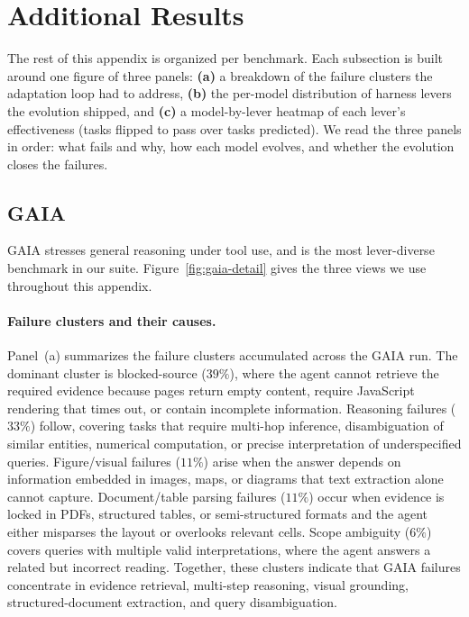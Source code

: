 \section{Additional Results}
\label{app:additional}

The rest of this appendix is organized per benchmark. Each subsection is built
around one figure of three panels: \textbf{(a)} a breakdown of the failure
clusters the adaptation loop had to address, \textbf{(b)} the per-model
distribution of harness levers the evolution shipped, and \textbf{(c)} a
model-by-lever heatmap of each lever's effectiveness (tasks flipped to pass over
tasks predicted). We read the three panels in order: what fails and why, how
each model evolves, and whether the evolution closes the failures. 

\subsection{GAIA}
\label{app:gaia-detail}

GAIA stresses general reasoning under tool use, and is the most lever-diverse
benchmark in our suite. Figure~\ref{fig:gaia-detail} gives the three views we
use throughout this appendix.

\paragraph{Failure clusters and their causes.} Panel~(a) summarizes the failure clusters accumulated across the GAIA run. The dominant cluster is blocked-source ($39\%$), where the agent cannot retrieve the required evidence because pages return empty content, require JavaScript rendering that times out, or contain incomplete information. Reasoning failures ($33\%$) follow, covering tasks that require multi-hop inference, disambiguation of similar entities, numerical computation, or precise interpretation of underspecified queries. Figure/visual failures ($11\%$) arise when the answer depends on information embedded in images, maps, or diagrams that text extraction alone cannot capture. Document/table parsing failures ($11\%$) occur when evidence is locked in PDFs, structured tables, or semi-structured formats and the agent either misparses the layout or overlooks relevant cells. Scope ambiguity ($6\%$) covers queries with multiple valid interpretations, where the agent answers a related but incorrect reading. Together, these clusters indicate that GAIA failures concentrate in evidence retrieval, multi-step reasoning, visual grounding, structured-document extraction, and query disambiguation.

